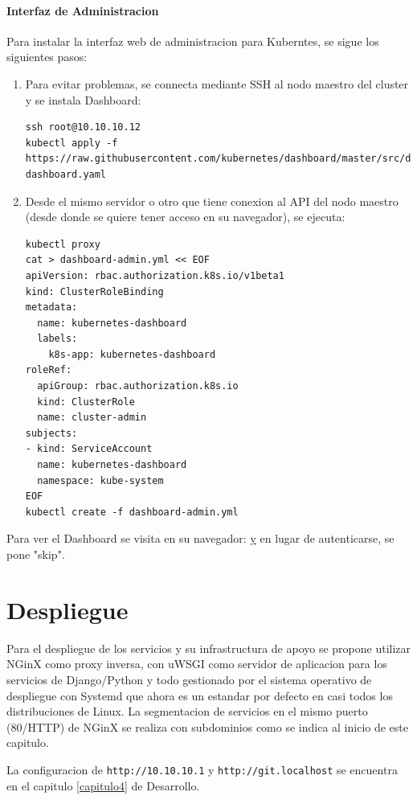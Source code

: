\paragraph{Interfaz de Administracion}
Para instalar la interfaz web de administracion para Kuberntes, se sigue los siguientes pasos:
\begin{enumerate}
	\item Para evitar problemas, se connecta mediante SSH al nodo maestro del cluster y se instala Dashboard:
		\begin{lstlisting}
ssh root@10.10.10.12
kubectl apply -f https://raw.githubusercontent.com/kubernetes/dashboard/master/src/deploy/recommended/kubernetes-dashboard.yaml
		\end{lstlisting}
	\item Desde el mismo servidor o otro que tiene conexion al API del nodo maestro (desde donde se quiere tener acceso en su navegador), se ejecuta:
    	\begin{lstlisting}
kubectl proxy
cat > dashboard-admin.yml << EOF       
apiVersion: rbac.authorization.k8s.io/v1beta1
kind: ClusterRoleBinding
metadata:
  name: kubernetes-dashboard
  labels:
    k8s-app: kubernetes-dashboard
roleRef:
  apiGroup: rbac.authorization.k8s.io
  kind: ClusterRole
  name: cluster-admin
subjects:
- kind: ServiceAccount
  name: kubernetes-dashboard
  namespace: kube-system
EOF
kubectl create -f dashboard-admin.yml
    	\end{lstlisting}
\end{enumerate}
Para ver el Dashboard se visita en su navegador: \href{http://localhost:8001/api/v1/namespaces/kube-system/services/https:kubernetes-dashboard:/proxy/} y en lugar de autenticarse, se pone "skip".
  

\section{Despliegue}
Para el despliegue de los servicios y su infrastructura de apoyo se propone utilizar NGinX como proxy inversa, con uWSGI como servidor de aplicacion para los servicios de Django/Python y todo gestionado por el sistema operativo de despliegue con Systemd que ahora es un estandar por defecto en casi todos los distribuciones de Linux. La segmentacion de servicios en el mismo puerto (80/HTTP) de NGinX se realiza con subdominios como se indica al inicio de este capitulo.

La configuracion de \texttt{http://10.10.10.1} y \texttt{http://git.localhost} se encuentra en el capitulo \ref{capitulo4} de Desarrollo.

